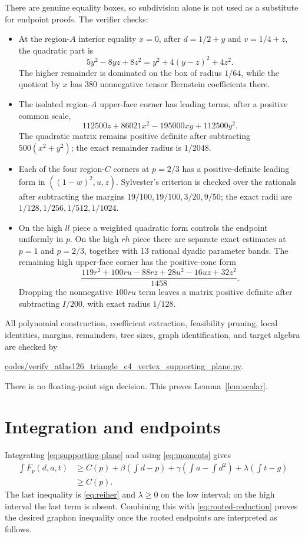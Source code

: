 \documentclass[11pt]{article}
\begin{document}
There are genuine equality boxes, so subdivision alone is not used as a
substitute for endpoint proofs.  The verifier checks:
\begin{itemize}
\item At the region-$A$ interior equality $x=0$, after
  $d=1/2+y$ and $v=1/4+z$, the quadratic part is
  \[
  5y^2-8yz+8z^2=y^2+4(y-z)^2+4z^2.
  \]
  The higher remainder is dominated on the box of radius $1/64$, while the
  quotient by $x$ has 380 nonnegative tensor Bernstein coefficients there.
\item The isolated region-$A$ upper-face corner has leading terms, after a
  positive common scale,
  \[
  112500z+86021x^2-195000xy+112500y^2.
  \]
  The quadratic matrix remains positive definite after subtracting
  $500(x^2+y^2)$; the exact remainder radius is $1/2048$.
\item Each of the four region-$C$ corners at $p=2/3$ has a positive-definite
  leading form in $((1-w)^2,u,z)$.  Sylvester's criterion is checked over
  the rationals after subtracting the margins
  $19/100,19/100,3/20,9/50$; the exact radii are
  $1/128,1/256,1/512,1/1024$.
\item On the high $ll$ piece a weighted quadratic form controls the endpoint
  uniformly in $p$.  On the high $rh$ piece there are separate exact
  estimates at $p=1$ and $p=2/3$, together with 13 rational dyadic parameter
  bands.  The remaining high upper-face corner has the positive-cone form
  \[
  \frac{119r^2+100ru-88rz+28u^2-16uz+32z^2}{1458}.
  \]
  Dropping the nonnegative $100ru$ term leaves a matrix positive definite
  after subtracting $I/200$, with exact radius $1/128$.
\end{itemize}
All polynomial construction, coefficient extraction, feasibility pruning,
local identities, margins, remainders, tree sizes, graph identification, and
target algebra are checked by
\begin{center}
\url{codes/verify_atlas126_triangle_c4_vertex_supporting_plane.py}.
\end{center}
There is no floating-point sign decision.  This proves
Lemma~\ref{lem:scalar}.

\section{Integration and endpoints}
\label{sec:endpoints}

Integrating \eqref{eq:supporting-plane} and using \eqref{eq:moments} gives
\begin{align*}
 \int F_p(d,a,t)
 &\ge C(p)
 +\beta\left(\int d-p\right)
 +\gamma\left(\int a-\int d^2\right)
 +\lambda\left(\int t-g\right)\\
 &\ge C(p).
\end{align*}
The last inequality is \eqref{eq:reiher} and $\lambda\ge0$ on the low
interval; on the high interval the last term is absent.  Combining this with
\eqref{eq:rooted-reduction} proves the desired graphon inequality once the
rooted endpoints are interpreted as follows.
\end{document}
